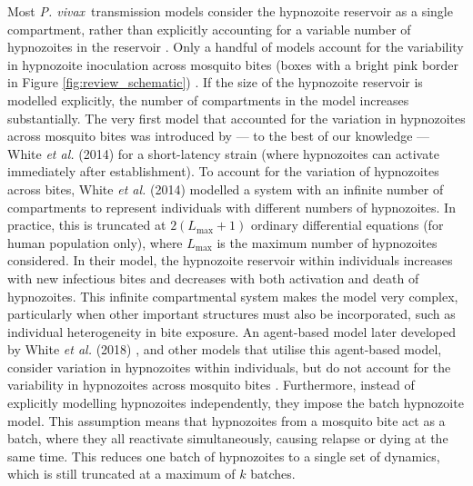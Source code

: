 \documentclass[12pt]{article}
\newcommand{\pv}{\textit{P. vivax}}
\newcommand{\etal}{\textit{et al. }}
\begin{document}
Most \pv~transmission models consider the hypnozoite reservoir as a single compartment, rather than explicitly accounting for a variable number of hypnozoites in the reservoir \cite{ishikawa2000prevalence,kammanee2001basic,ishikawa2003mathematical,pongsumpun2007transmission,pongsumpun2008mathematical,pongsumpun2008plasmodium,nah2010dilution,pongsumpun2010impact,aguas2012modeling,chamchod2013modeling,roy2013potential,huo2014stability,robinson2015strategies,white2016variation,pizzitutti2015validated,prihantini2017stability,kammanee2019mathematical,gebremichaelrelapse,kim2019effects,silal2019malaria,gharakhanlou2019developing,kim2020mathematical,corder2020modelling,nyaberi2020mathematical,ghosh2020mathematical,baihaqi2020modelling,abimbade2022recurrent,tasman2022assessing,olaniyi2023optimal,ahkrizal2023dynamics}. Only a handful of models account for the variability in hypnozoite inoculation across mosquito bites (boxes with a bright pink border in Figure \ref{fig:review_schematic}) \cite{white2014modelling,mehra2022hypnozoite,anwar2022multiscale,anwar2023optimal}. If the size of the hypnozoite reservoir is modelled explicitly, the number of compartments in the model increases substantially. The very first model that accounted for the variation in hypnozoites across mosquito bites was introduced by \mbox{---} to the best of our knowledge \mbox{---} White \etal(2014) \cite{white2014modelling} for a short-latency strain (where hypnozoites can activate immediately after establishment). To account for the variation of hypnozoites across bites, White \textit{et al.} (2014) modelled a system with an infinite number of compartments to represent individuals with different numbers of hypnozoites. In practice, this is truncated at $2(L_{\text{max}}+1)$ ordinary differential equations (for human population only), where $L_{\text{max}}$ is the maximum number of hypnozoites considered. In their model, the hypnozoite reservoir within individuals increases with new infectious bites and decreases with both activation and death of hypnozoites. This infinite compartmental system makes the model very complex, particularly when other important structures must also be incorporated, such as individual heterogeneity in bite exposure. An agent-based model later developed by White \etal(2018) \cite{white2018mathematical}, and other models that utilise this agent-based model, consider variation in hypnozoites within individuals, but do not account for the variability in hypnozoites across mosquito bites \cite{huber2021radical,nekkab2021estimated,white2022potential,obadia2022developing}. Furthermore, instead of explicitly modelling hypnozoites independently, they impose the batch hypnozoite model. This assumption means that hypnozoites from a mosquito bite act as a batch, where they all reactivate simultaneously, causing relapse or dying at the same time. This reduces one batch of hypnozoites to a single set of dynamics, which is still truncated at a maximum of $k$ batches. 
\end{document}
